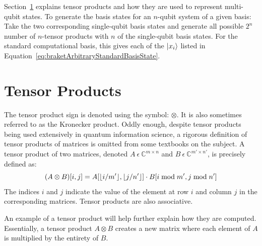 Section~\ref{sec:tensorProducts} explains tensor products and how they are used to represent multi-qubit states. To generate the basis states for an $n$-qubit system of a given basis: Take the two corresponding single-qubit basis states and generate all possible $2^n$ number of $n$-tensor products with $n$ of the single-qubit basis states. For the standard computational basis, this gives each of the $\ket{x_i}$ listed in Equation~\eqref{eq:braketArbitraryStandardBasisState}.
\section{Tensor Products}
\label{sec:tensorProducts}
The tensor product sign is denoted using the symbol: $\otimes$. It is also sometimes referred to as the Kronecker product. Oddly enough, despite tensor products being used extensively in quantum information science, a rigorous definition of tensor products of matrices is omitted from some textbooks on the subject. A tensor product of two matrices, denoted $A \ \epsilon \ \mathbb{C}^{m \times n}$ and $B \ \epsilon \ \mathbb{C}^{m' \times n'}$, is precisely defined as: $$(A \otimes B)[i,j] = A[\lfloor i/m'\rfloor,\lfloor j/n'\rfloor] \cdot B[i \bmod m', j \bmod n']$$
The indices $i$ and $j$ indicate the value of the element at row $i$ and column $j$ in the corresponding matrices. Tensor products are also associative.

An example of a tensor product will help further explain how they are computed. Essentially, a tensor product $A \otimes B$ creates a new matrix where each element of $A$ is multiplied by the entirety of $B$.

